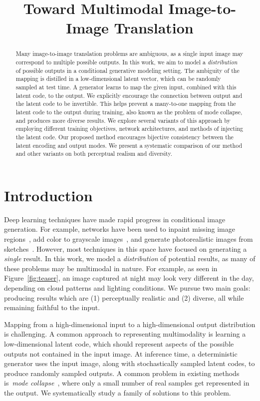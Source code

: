 \title{Toward Multimodal Image-to-Image Translation}

\begin{abstract}
Many image-to-image translation problems are ambiguous, as a single input image may correspond to multiple possible outputs. In this work, we aim to model a \emph{distribution} of possible outputs in a conditional generative modeling setting. The ambiguity of the mapping is distilled in a low-dimensional latent vector, which can be randomly sampled at test time. A generator learns to map the given input, combined with this latent code, to the output. We explicitly encourage the connection between output and the latent code to be invertible. This helps prevent a many-to-one mapping from the latent code to the output during training, also known as the problem of mode collapse, and produces more diverse results. We explore several variants of this approach by employing different training objectives, network architectures, and methods of injecting the latent code. Our proposed method encourages bijective consistency between the latent encoding and output modes. We present a systematic comparison of our method and other variants on both perceptual realism and diversity.
\end{abstract}

\section{Introduction}
Deep learning techniques have made rapid progress in conditional image generation. For example, networks have been used to inpaint missing image regions~\citep{pathakCVPR16context,yang2016high,isola2016image}, add color to grayscale images~\citep{iizuka2016let,larsson2016learning,zhang2016colorful,isola2016image}, and generate photorealistic images from sketches~\cite{sangkloy2017scribbler,isola2016image}. However, most techniques in this space have focused on generating a \textit{single} result. In this work, we model a \textit{distribution} of potential results, as many of these problems may be multimodal in nature. For example, as seen in Figure~\ref{fig:teaser}, an image captured at night may look very different in the day, depending on cloud patterns and lighting conditions. We pursue two main goals: producing results which are (1) perceptually realistic and (2) diverse, all while remaining faithful to the input.

Mapping from a high-dimensional input to a high-dimensional output distribution is challenging. A common approach to representing multimodality is learning a low-dimensional latent code, which should represent aspects of the possible outputs not contained in the input image. At inference time, a deterministic generator uses the input image, along with stochastically sampled latent codes, to produce randomly sampled outputs. A common problem in existing methods is~\textit{mode collapse}~\citep{goodfellow2016nips}, where only a small number of real samples get represented in the output. We systematically study a family of solutions to this problem.

